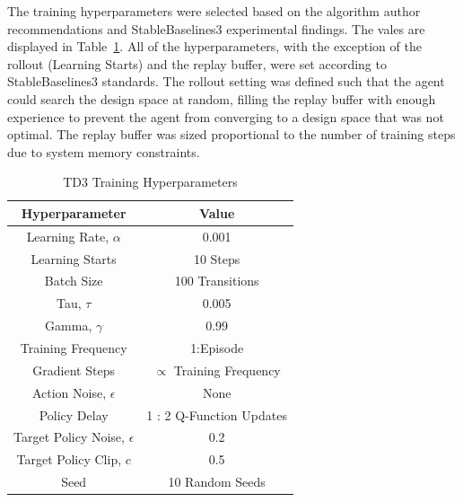 \documentclass[10pt,twocolumn,letterpaper]{article}
\begin{document}
The training hyperparameters were selected based on the algorithm author recommendations and StableBaselines3 experimental findings. The vales are displayed in Table~\ref{tab:training_hyperameters}. All of the hyperparameters, with the exception of the rollout (Learning Starts) and the replay buffer, were set according to StableBaselines3 standards. The rollout setting was defined such that the agent could search the design space at random, filling the replay buffer with enough experience to prevent the agent from converging to a design space that was not optimal. The replay buffer was sized proportional to the number of training steps due to system memory constraints.  
%
\begin{table}[t]
        \caption{TD3 Training Hyperparameters}
        \vspace{-4mm}
        \label{tab:training_hyperameters}
        \begin{center}
        \begin{tabular}{|c||c|}
        \hline
        Hyperparameter                     & Value                           \\
        \hline
        Learning Rate, $\alpha$         & 0.001                           \\
        Learning Starts                 & 10 Steps                        \\
        Batch Size                      & 100 Transitions                 \\
        Tau, $\tau$                     & 0.005                           \\
        Gamma, $\gamma$                 & 0.99                            \\
        Training Frequency              & 1:Episode                       \\
        Gradient Steps                  & $\propto$ Training Frequency    \\
        Action Noise,  $\epsilon$       & None                            \\
        Policy Delay                    & 1 : 2 Q-Function Updates        \\
        Target Policy Noise, $\epsilon$ & 0.2                             \\
        Target Policy Clip, $c$         & 0.5                             \\
        Seed                            & 10 Random Seeds                 \\
        \hline
        \end{tabular}
        \end{center}
        \vspace{-5mm}
\end{table}
\end{document}
